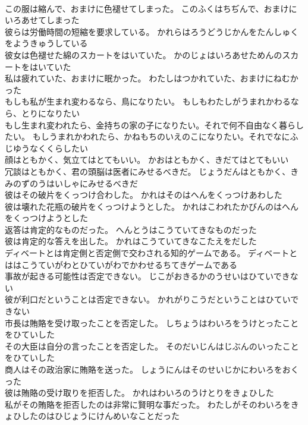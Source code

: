 \documentclass[8pt]{extreport}
\begin{document}
\begin{CJK}{UTF8}{min}
\\	この服は縮んで、おまけに色褪せてしまった。	このふくはちぢんで、おまけにいろあせてしまった 
\\	彼らは労働時間の短縮を要求している。	かれらはろうどうじかんをたんしゅくをようきゅうしている 
\\	彼女は色褪せた綿のスカートをはいていた。	かのじょはいろあせためんのスカートをはいていた 
\\	私は疲れていた、おまけに眠かった。	わたしはつかれていた、おまけにねむかった 
\\	もしも私が生まれ変わるなら、鳥になりたい。	もしもわたしがうまれかわるなら、とりになりたい 
\\	もし生まれ変われたら、金持ちの家の子になりたい。それで何不自由なく暮らしたい。	もしうまれかわれたら、かねもちのいえのこになりたい。それでなにふじゆうなくくらしたい 
\\	顔はともかく、気立てはとてもいい。	かおはともかく、きだてはとてもいい 
\\	冗談はともかく、君の頭脳は医者にみせるべきだ。	じょうだんはともかく、きみのずのうはいしゃにみせるべきだ 
\\	彼はその破片をくっつけ合わした。	かれはそのはへんをくっつけあわした 
\\	彼は壊れた花瓶の破片をくっつけようとした。	かれはこわれたかびんのはへんをくっつけようとした 
\\	返答は肯定的なものだった。	へんとうはこうていてきなものだった 
\\	彼は肯定的な答えを出した。	かれはこうていてきなこたえをだした 
\\	ディベートとは肯定側と否定側で交わされる知的ゲームである。	ディベートとははこうていがわとひていがわでかわせるちてきゲームである 
\\	事故が起きる可能性は否定できない。	じこがおきるかのうせいはひていできない 
\\	彼が利口だということは否定できない。	かれがりこうだということはひていできない 
\\	市長は賄賂を受け取ったことを否定した。	しちょうはわいろをうけとったことをひていした 
\\	その大臣は自分の言ったことを否定した。	そのだいじんはじぶんのいったことをひていした 
\\	商人はその政治家に賄賂を送った。	しょうにんはそのせいじかにわいろをおくった 
\\	彼は賄賂の受け取りを拒否した。	かれはわいろのうけとりをきょひした 
\\	私がその賄賂を拒否したのは非常に賢明な事だった。	わたしがそのわいろをきょひしたのはひじょうにけんめいなことだった 

\end{CJK}
\end{document}
